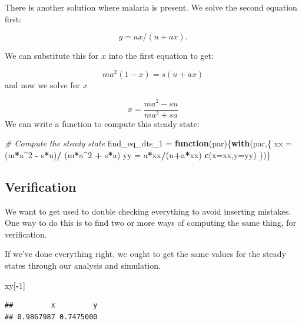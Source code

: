 \documentclass[
]{book}
\newenvironment{Shaded}{\begin{snugshade}}{\end{snugshade}}
\newcommand{\AttributeTok}[1]{\textcolor[rgb]{0.13,0.29,0.53}{#1}}
\newcommand{\CommentTok}[1]{\textcolor[rgb]{0.56,0.35,0.01}{\textit{#1}}}
\newcommand{\ControlFlowTok}[1]{\textcolor[rgb]{0.13,0.29,0.53}{\textbf{#1}}}
\newcommand{\DecValTok}[1]{\textcolor[rgb]{0.00,0.00,0.81}{#1}}
\newcommand{\FunctionTok}[1]{\textcolor[rgb]{0.13,0.29,0.53}{\textbf{#1}}}
\newcommand{\NormalTok}[1]{#1}
\newcommand{\OtherTok}[1]{\textcolor[rgb]{0.56,0.35,0.01}{#1}}
\newcommand{\SpecialCharTok}[1]{\textcolor[rgb]{0.81,0.36,0.00}{\textbf{#1}}}
\begin{document}
There is another solution where malaria is present. We solve the second equation first:

\[y = a x / (u + a x).\]

We can substitute this for \(x\) into the first equation to get:

\[m a^2 (1-x) =  s (u+ax)\]
and now we solve for \(x\)

\[x = \frac{\textstyle{ma^2 - su}}{\textstyle{ma^2 + sa}}\]
We can write a function to compute this steady state:

\begin{Shaded}
\begin{Highlighting}[]
\CommentTok{\# Compute the steady state }
\NormalTok{find\_eq\_dts\_1 }\OtherTok{=} \ControlFlowTok{function}\NormalTok{(par)\{}\FunctionTok{with}\NormalTok{(par,\{}
\NormalTok{  xx }\OtherTok{=}\NormalTok{ (m}\SpecialCharTok{*}\NormalTok{a}\SpecialCharTok{\^{}}\DecValTok{2} \SpecialCharTok{{-}}\NormalTok{ s}\SpecialCharTok{*}\NormalTok{u)}\SpecialCharTok{/}\NormalTok{ (m}\SpecialCharTok{*}\NormalTok{a}\SpecialCharTok{\^{}}\DecValTok{2} \SpecialCharTok{+}\NormalTok{ s}\SpecialCharTok{*}\NormalTok{a)}
\NormalTok{  yy }\OtherTok{=}\NormalTok{ a}\SpecialCharTok{*}\NormalTok{xx}\SpecialCharTok{/}\NormalTok{(u}\SpecialCharTok{+}\NormalTok{a}\SpecialCharTok{*}\NormalTok{xx) }
  \FunctionTok{c}\NormalTok{(}\AttributeTok{x=}\NormalTok{xx,}\AttributeTok{y=}\NormalTok{yy)}
\NormalTok{\})\}}
\end{Highlighting}
\end{Shaded}

\subsection{Verification}\label{verification}

We want to get used to double checking everything to avoid inserting mistakes. One way to do this is to find two or more ways of computing the same thing, for verification.

If we've done everything right, we ought to get the same values for the steady states through our analysis and simulation.

\begin{Shaded}
\begin{Highlighting}[]
\NormalTok{xy[}\SpecialCharTok{{-}}\DecValTok{1}\NormalTok{]}
\end{Highlighting}
\end{Shaded}

\begin{verbatim}
##         x         y 
## 0.9867987 0.7475000
\end{verbatim}
\end{document}
